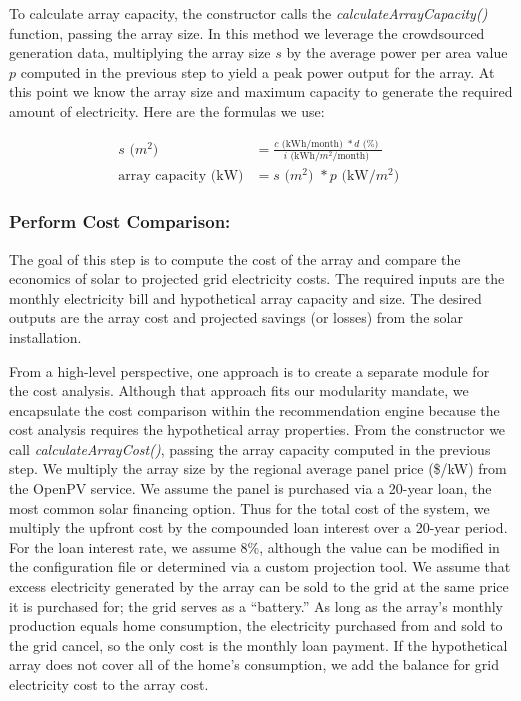 \documentclass[pageno]{jpaper}
\begin{document}
To calculate array capacity, the constructor calls the {\em calculateArrayCapacity()} function, passing the array size. In this method we leverage the crowdsourced generation data, multiplying the array size $s$ by the average power per area value $p$ computed in the previous step to yield a peak power output for the array.  At this point we know the array size and maximum capacity to generate the required amount of electricity. Here are the formulas we use:

\begin{align}
s \text{ ($m^2$) } &= \frac{c \text{ (kWh/month) } * d \text{ (\%) }} { i \text{ (kWh/$m^2$/month) }} \\
\text {array capacity (kW)} &= s \text{ ($m^2$) } * p \text{ (kW/$m^2$) }
\end{align}

\subsubsection{Perform Cost Comparison:}
The goal of this step is to compute the cost of the array and compare the economics of solar to projected grid electricity costs. The required inputs are the monthly electricity bill and hypothetical array capacity and size. The desired outputs are the array cost and projected savings (or losses) from the solar installation.

From a high-level perspective, one approach is to create a separate module for the cost analysis. Although that approach fits our modularity mandate, we encapsulate the cost comparison within the recommendation engine because the cost analysis requires the hypothetical array properties. From the constructor we call {\em calculateArrayCost()}, passing the array capacity computed in the previous step. We multiply the array size by the regional average panel price (\$/kW) from the OpenPV service. We assume the panel is purchased via a 20-year loan, the most common solar financing option. Thus for the total cost of the system, we multiply the upfront cost by the compounded loan interest over a 20-year period. For the loan interest rate, we assume 8\%, although the value can be modified in the configuration file or determined via a custom projection tool. We assume that excess electricity generated by the array can be sold to the grid at the same price it is purchased for; the grid serves as a ``battery.'' As long as the array's monthly production equals home consumption, the electricity purchased from and sold to the grid cancel, so the only cost is the monthly loan payment. If the hypothetical array does not cover all of the home's consumption, we add the balance for grid electricity cost to the array cost.
\end{document}
